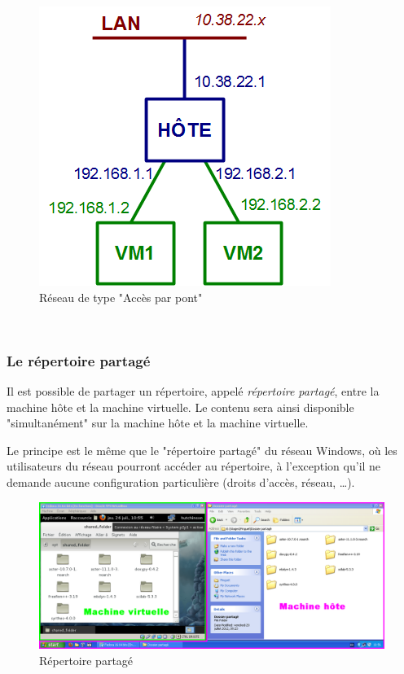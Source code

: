 \begin{figure}[H]
	\center
	\includegraphics[scale=0.5]{img/types_reseau/Acces_prive_hote.png}
	\caption{Réseau de type "Accès par pont"}
	\label{Schéma Accès par pont}
\end{figure}
~~\\




\subsubsection{Le répertoire partagé}
\label{Le répertoire partagé}

Il est possible de partager un répertoire, appelé \textit{répertoire partagé}, entre la machine hôte et la machine virtuelle.
Le contenu sera ainsi disponible "simultanément" sur la machine hôte et la machine virtuelle.

Le principe est le même que le "répertoire partagé" du réseau Windows, où les utilisateurs du réseau pourront accéder au répertoire, à l'exception qu'il ne demande aucune configuration particulière (droits d'accès, réseau, \ldots).
\\


\begin{figure}[!h]
	\center
	\includegraphics[scale=0.35]{img/Repertoire_partage.png}
	\caption{Répertoire partagé}
	\label{Screenshot Répertoire partagé}
\end{figure}

